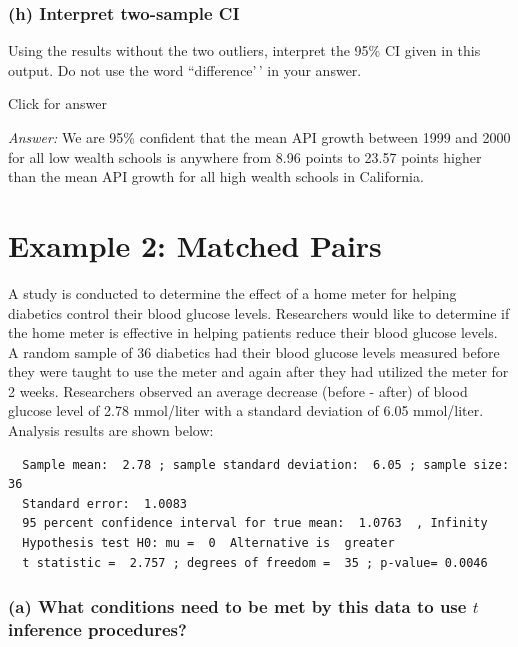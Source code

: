 \documentclass[
]{book}
\begin{document}
\hypertarget{h-interpret-two-sample-ci}{%
\subsubsection{(h) Interpret two-sample CI}\label{h-interpret-two-sample-ci}}

Using the results without the two outliers, interpret the 95\% CI given in this output. Do not use the word ``difference'\,' in your answer.

Click for answer

\emph{Answer:} We are 95\% confident that the mean API growth between 1999 and 2000 for all low wealth schools is anywhere from 8.96 points to 23.57 points higher than the mean API growth for all high wealth schools in California.

\hypertarget{example-2-matched-pairs}{%
\section{Example 2: Matched Pairs}\label{example-2-matched-pairs}}

A study is conducted to determine the effect of a home meter for helping diabetics control their blood glucose levels. Researchers would like to determine if the home meter is effective in helping patients reduce their blood glucose levels. A random sample of 36 diabetics had their blood glucose levels measured before they were taught to use the meter and again after they had utilized the meter for 2 weeks. Researchers observed an average decrease (before - after) of blood glucose level of 2.78 mmol/liter with a standard deviation of 6.05 mmol/liter. Analysis results are shown below:

\begin{verbatim}
  Sample mean:  2.78 ; sample standard deviation:  6.05 ; sample size: 36
  Standard error:  1.0083
  95 percent confidence interval for true mean:  1.0763  , Infinity
  Hypothesis test H0: mu =  0  Alternative is  greater
  t statistic =  2.757 ; degrees of freedom =  35 ; p-value= 0.0046
\end{verbatim}

\hypertarget{a-what-conditions-need-to-be-met-by-this-data-to-use-t-inference-procedures}{%
\subsubsection{\texorpdfstring{(a) What conditions need to be met by this data to use \(t\) inference procedures?}{(a) What conditions need to be met by this data to use t inference procedures?}}\label{a-what-conditions-need-to-be-met-by-this-data-to-use-t-inference-procedures}}
\end{document}
